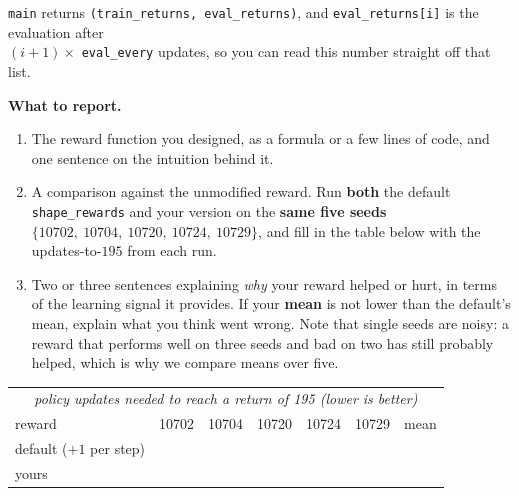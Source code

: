 \begin{enumerate}
    \texttt{main} returns \verb|(train_returns, eval_returns)|, and
    \verb|eval_returns[i]| is the evaluation after\\
    $(i+1) \times$
    \verb|eval_every| updates, so you can read this number straight off that
    list.

    \textbf{What to report.}
    \begin{enumerate}[label=(\alph*)]
        \item The reward function you designed, as a formula or a few lines of
        code, and one sentence on the intuition behind it.
        \item A comparison against the unmodified reward. Run \textbf{both} the
        default \texttt{shape\_rewards} and your version on the \textbf{same
        five seeds} $\{10702,\ 10704,\ 10720,\ 10724,\ 10729\}$, and fill in the
        table below with the updates-to-$195$ from each run.
        \item Two or three sentences explaining \emph{why} your reward helped or
        hurt, in terms of the learning signal it provides. If your \textbf{mean}
        is not lower than the default's mean, explain what you think went wrong.
        Note that single seeds are noisy: a reward that performs well on three seeds and
        bad on two has still probably helped, which is why we compare means
        over five.
    \end{enumerate}

    \begin{center}
    \begin{tabular}{lcccccc}
    \toprule
    \multicolumn{7}{c}{\emph{policy updates needed to reach a return of 195 (lower is better)}} \\
    reward & 10702 & 10704 & 10720 & 10724 & 10729 & mean \\
    \midrule
    default ($+1$ per step) & & & & & & \\
    yours                   & & & & & & \\
    \bottomrule
    \end{tabular}
    \end{center}

    \begin{tcolorbox}[fit,height=13cm, width=15cm, blank, borderline={1pt}{-2pt}]

    \end{tcolorbox}

\end{enumerate}
